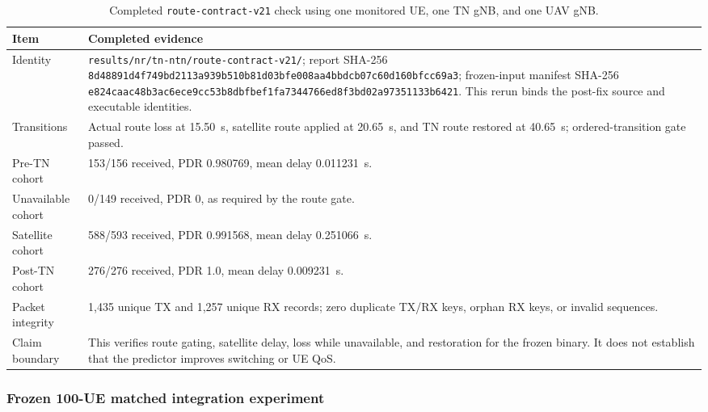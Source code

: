 \begin{table}[t]
\centering
\footnotesize
\caption{Completed \texttt{route-\allowbreak contract-\allowbreak v21} check using one monitored UE, one TN gNB, and one UAV gNB.}
\label{tab:audited_route_contract}
\begin{tabular}{p{} p{}}
\hline
Item & Completed evidence \\
\hline
Identity & \texttt{results/\allowbreak nr/\allowbreak tn-\allowbreak ntn/\allowbreak route-\allowbreak contract-\allowbreak v21/\allowbreak }; report SHA-256 \texttt{8d48891d4f749bd2\allowbreak 113a939b510b81d0\allowbreak 3bfe008aa4bbdcb0\allowbreak 7c60d160bfcc69a3}; frozen-input manifest SHA-256 \texttt{e824caac48b3ac6e\allowbreak ce9cc53b8dbfbef1\allowbreak fa7344766ed8f3bd\allowbreak 02a97351133b6421}.  This rerun binds the post-fix source and executable identities. \\
Transitions & Actual route loss at 15.50~s, satellite route applied at 20.65~s, and TN route restored at 40.65~s; ordered-transition gate passed. \\
Pre-TN cohort & 153/156 received, PDR 0.980769, mean delay 0.011231~s. \\
Unavailable cohort & 0/149 received, PDR 0, as required by the route gate. \\
Satellite cohort & 588/593 received, PDR 0.991568, mean delay 0.251066~s. \\
Post-TN cohort & 276/276 received, PDR 1.0, mean delay 0.009231~s. \\
Packet integrity & 1,435 unique TX and 1,257 unique RX records; zero duplicate TX/RX keys, orphan RX keys, or invalid sequences. \\
Claim boundary & This verifies route gating, satellite delay, loss while unavailable, and restoration for the frozen binary.  It does not establish that the predictor improves switching or UE QoS. \\
\hline
\end{tabular}
\end{table}

\subsubsection*{Frozen 100-UE matched integration experiment}

